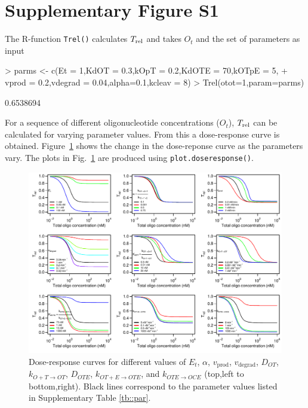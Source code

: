 \documentclass[a4paper,11pt]{article}
\newcommand{\ko}{k_{O+T \to OT}}
\newcommand{\kt}{k_{OT+E \to OTE}}
\newcommand{\kE}{k_{OTE \to OCE}}
\newcommand{\vp}{v_{\mathrm{prod}}}
\newcommand{\vd}{v_{\mathrm{degrad}}}
\newcommand{\Trel}{T_{\rm{rel}}}
\begin{document}
\section{Supplementary Figure S1}
The R-function \texttt{Trel()} calculates $\Trel$ and takes $O_t$ and the set of parameters as input
\begin{Schunk}
\begin{Sinput}
> parms <- c(Et = 1,KdOT = 0.3,kOpT = 0.2,KdOTE = 70,kOTpE = 5,	
+            vprod = 0.2,vdegrad = 0.04,alpha=0.1,kcleav = 8)
> Trel(otot=1,param=parms)
\end{Sinput}
\begin{Soutput}
[1] 0.6538694
\end{Soutput}
\end{Schunk}
For a sequence of different oligonucleotide concentrations ($O_t$), $\Trel$ can be calculated for varying parameter values. From this a dose-response curve is obtained.  Figure~\ref{fig::Etot} shows the change in the dose-reponse curve as the parameters vary. The plots in Fig.~\ref{fig::Etot} are produced using \texttt{plot.doseresponse()}.
\begin{figure}[!t]
\includegraphics[width=\textwidth]{SuppFile1-S1.pdf}
\caption{Dose-response curves for different values of $E_{t}$, $\alpha$, $\vp$, $\vd$, $D_{OT}$, $\ko$, $D_{OTE}$, $\kt$, and $\kE$ (top,left to bottom,right). Black lines correspond to the parameter values listed in Supplementary Table \ref{tb::par}.}\label{fig::Etot}
\end{figure}
\end{document}
